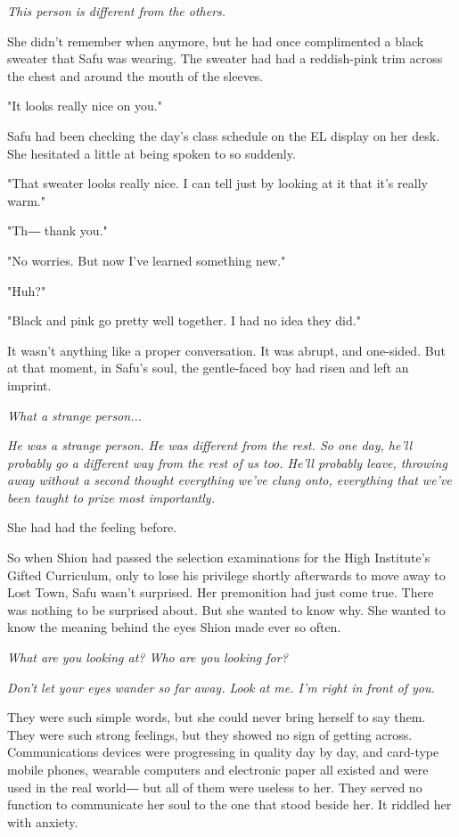 \emph{This person is different from the others.}

She didn't remember when anymore, but he had once complimented a black
sweater that Safu was wearing. The sweater had had a reddish-pink trim
across the chest and around the mouth of the sleeves.

"It looks really nice on you."

Safu had been checking the day's class schedule on the EL display on her
desk. She hesitated a little at being spoken to so suddenly.

"That sweater looks really nice. I can tell just by looking at it that
it's really warm."

"Th― thank you."

"No worries. But now I've learned something new."

"Huh?"

"Black and pink go pretty well together. I had no idea they did."

It wasn't anything like a proper conversation. It was abrupt, and
one-sided. But at that moment, in Safu's soul, the gentle-faced boy had
risen and left an imprint.

\emph{What a strange person...}

\emph{He was a strange person. He was different from the rest. So one day,
he'll probably go a different way from the rest of us too. He'll
probably leave, throwing away without a second thought everything we've
clung onto, everything that we've been taught to prize most importantly.}

She had had the feeling before.

So when Shion had passed the selection examinations for the High
Institute's Gifted Curriculum, only to lose his privilege shortly
afterwards to move away to Lost Town, Safu wasn't surprised. Her
premonition had just come true. There was nothing to be surprised about.
But she wanted to know why. She wanted to know the meaning behind the
eyes Shion made ever so often.

\emph{What are you looking at? Who are you looking for?}

\emph{Don't let your eyes wander so far away. Look at me. I'm right in front
of you.}

They were such simple words, but she could never bring herself to say
them. They were such strong feelings, but they showed no sign of getting
across. Communications devices were progressing in quality day by day,
and card-type mobile phones, wearable computers and electronic paper all
existed and were used in the real world― but all of them were useless to
her. They served no function to communicate her soul to the one that
stood beside her. It riddled her with anxiety.

